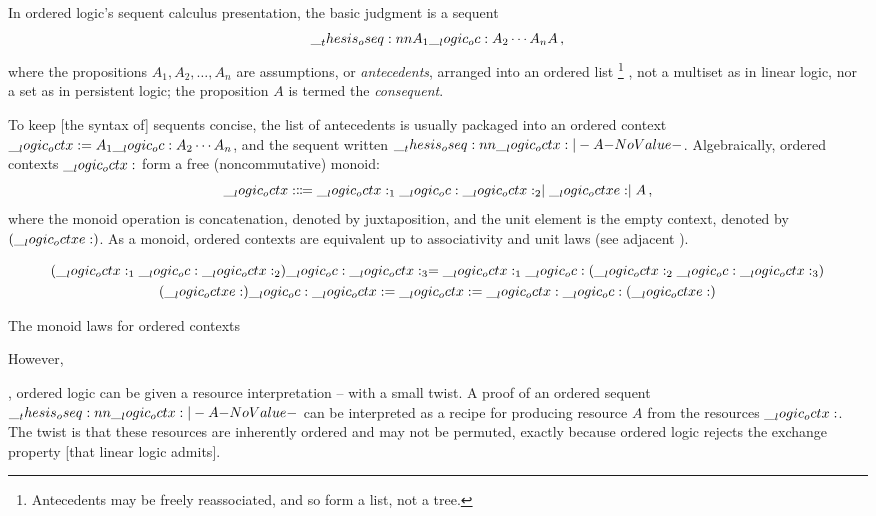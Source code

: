 In ordered logic's sequent calculus presentation, the basic judgment is a sequent
\begin{equation*}
  \oseq{A_1 \oc A_2 \dotsb A_n |- A} \,,
\end{equation*}
where the propositions $A_1, A_2, \dotsc, A_n$ are assumptions, or \emph{antecedents}, arranged into an ordered list%
\footnote{Antecedents may be freely reassociated, and so form a list, not a tree.}%
, not a multiset as in linear logic, nor a set as in persistent logic; the proposition $A$ is termed the \emph{consequent}.

To keep [the syntax of] sequents concise, the list of antecedents is usually packaged into an ordered context $\__logic_octx: = A_1 \__logic_oc: A_2 \dotsb A_n$, and the sequent written $\oseq{\octx |- A}$.
Algebraically, ordered contexts $\__logic_octx:$ form a free (noncommutative) monoid:
\begin{equation*}
  \__logic_octx: \Coloneqq \__logic_octx:_1 \__logic_oc: \__logic_octx:_2 \mid \__logic_octxe: \mid A \,,
\end{equation*}
where the monoid operation is concatenation, denoted by juxtaposition, and the unit element is the empty context, denoted by $(\__logic_octxe:)$.
As a monoid, ordered contexts are equivalent up to associativity and unit laws (see adjacent ).%
\begin{marginfigure}
  \begin{gather*}
    (\__logic_octx:_1 \__logic_oc: \__logic_octx:_2) \__logic_oc: \__logic_octx:_3 = \__logic_octx:_1 \__logic_oc: (\__logic_octx:_2 \__logic_oc: \__logic_octx:_3) \\
    (\__logic_octxe:) \__logic_oc: \__logic_octx: = \__logic_octx: = \__logic_octx: \__logic_oc: (\__logic_octxe:)
  \end{gather*}
  \caption{The monoid laws for ordered contexts}\label{fig:ordered-logic:monoid-laws}
\end{marginfigure}
However, 

\autocite{Wadler:??}, ordered logic can be given a resource interpretation -- with a small twist.
A proof of an ordered sequent $\oseq{\octx |- A}$ can be interpreted as a recipe for producing resource $A$ from the resources $\__logic_octx:$.
The twist is that these resources are inherently ordered and may not be permuted, exactly because ordered logic rejects the exchange property [that linear logic admits].



